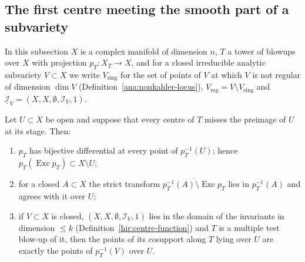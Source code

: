 \subsection{The first centre meeting the smooth part of a subvariety}

In this subsection \(X\) is a complex manifold of dimension \(n\), \(T\) a tower of blowups over \(X\) with projection \(p_T\colon X_T\to X\), and for a closed
irreducible analytic subvariety \(V\subset X\) we write \(V_{\mathrm{sing}}\) for the set of points of \(V\) at which \(V\) is not regular of dimension \(\dim V\)
(Definition~\ref{ana:nonkahler-locus}), \(V_{\mathrm{reg}}=V\setminus V_{\mathrm{sing}}\) and \(\underline{\mathcal I}_V=(X,X,\emptyset,\mathcal I_V,1)\).

\begin{lemma}
\label{mc:centres-avoid-open}
\leanok
Let \(U\subset X\) be open and suppose that every centre of \(T\) misses the preimage of \(U\) at its stage. Then:
\begin{enumerate}
\item \(p_T\) has bijective differential at every point of \(p_T^{-1}(U)\); hence \(p_T(\operatorname{Exc}p_T)\subset X\setminus U\);
\item for a closed \(A\subset X\) the strict transform \(\overline{p_T^{-1}(A)\setminus\operatorname{Exc}p_T}\) lies in \(p_T^{-1}(A)\) and agrees with it over \(U\);
\item if \(V\subset X\) is closed, \((X,X,\emptyset,\mathcal I_V,1)\) lies in the domain of the invariants in dimension \(\le k\)
(Definition~\ref{hir:centre-function}) and \(T\) is a multiple test blow-up of it, then the points of its cosupport along \(T\) lying over \(U\) are exactly
the points of \(p_T^{-1}(V)\) over \(U\).
\end{enumerate}
\end{lemma}

